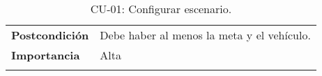 \begin{longtable}[H]{@{}ll@{}}
\begin{minipage}[t]{0.23\columnwidth}\raggedright\strut
\textbf{Postcondición}\strut
\end{minipage} & \begin{minipage}[t]{0.71\columnwidth}\raggedright\strut
Debe haber al menos la meta y el vehículo.\strut
\end{minipage}\tabularnewline

\begin{minipage}[t]{0.23\columnwidth}\raggedright\strut
\textbf{Importancia}\strut
\end{minipage} & \begin{minipage}[t]{0.71\columnwidth}\raggedright\strut
Alta\strut
\end{minipage}\tabularnewline

\bottomrule
\caption{CU-01: Configurar escenario.}
\end{longtable}


